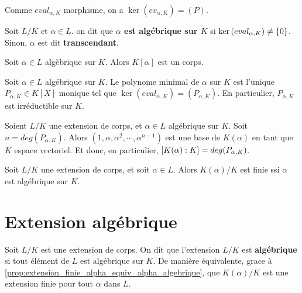 Comme $eval_{\alpha, K}$ morphisme, on a $\ker{(ev_{\alpha, K})} = (P)$.

\begin{definition} 
	Soit $L/K$ et $\alpha \in L$. on dit que \textbf{$\alpha$ est algébrique sur
	$K$} si $\ker{(eval_{\alpha, K})} \neq \left\{0 \right\}$.
	Sinon, $\alpha$ est dit \textbf{transcendant}.
\end{definition}

\begin{proposition}
	Soit $\alpha \in L$ algèbrique sur $K$. Alors $K[\alpha]$ est un corps.
\end{proposition}

\begin{definition} 
	Soit $\alpha \in L$ algébrique sur $K$. Le polynome minimal de $\alpha$ sur
	$K$ est l'unique $P_{\alpha, K} \in K[X]$ monique tel que $\ker{(eval_{\alpha,
	K})} = (P_{\alpha, K})$. En particulier, $P_{\alpha, K}$ est irréductible
	sur $K$.
\end{definition}

\begin{proposition}
	\label{prop:extension_finie_alpha_equiv_alpha_algebrique}
	Soient $L/K$ une extension de corps, et $\alpha \in L$ algébrique sur $K$.
	Soit $n = deg(P_{\alpha, K})$.
	Alors $(1, \alpha, \alpha^{2}, \cdots, \alpha^{n - 1})$ est une base de $K(\alpha)$ en tant que $K$
	espace vectoriel. Et donc, en particulier, $[K(\alpha) : K] =
	deg(P_{\alpha, K})$.
\end{proposition}

\begin{corollary}
	Soit $L/K$ une extension de corps, et soit $\alpha \in L$. Alors
	$K(\alpha)/K$ est finie ssi $\alpha$ est algébrique sur $K$.
\end{corollary}

\section{Extension algébrique}

\begin{definition} 
	Soit $L/K$ est une extension de corps. On dit que l'extension $L/K$ est
	\textbf{algébrique} si tout élément de $L$ est algébrique sur $K$. De
	manière équivalente, grace à
	\ref{prop:extension_finie_alpha_equiv_alpha_algebrique}, que $K(\alpha)/K$
	est une extension finie pour tout $\alpha$ dans $L$.
\end{definition}

